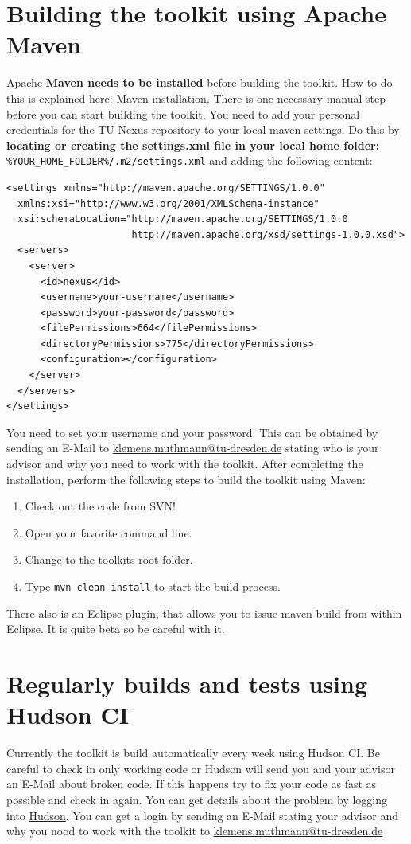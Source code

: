 \documentclass[a4paper,twoside]{book}      %
\begin{document}
\section{Building the toolkit using Apache Maven}
\label{sec:buildingthetoolkitusingapachemaven}
Apache \textbf{Maven needs to be installed} before building the toolkit. How to do this is explained here: \href{http://maven.apache.org/download.html#Installation}{Maven installation}. There is one necessary manual step before you can start building the toolkit. You need to add your personal credentials for the TU Nexus repository to your local maven settings. Do this by \textbf{locating or creating the settings.xml file in your local home folder:} \texttt{\%YOUR\_HOME\_FOLDER\%/.m2/settings.xml} and adding the following content:
\begin{verbatim}
<settings xmlns="http://maven.apache.org/SETTINGS/1.0.0"
  xmlns:xsi="http://www.w3.org/2001/XMLSchema-instance"
  xsi:schemaLocation="http://maven.apache.org/SETTINGS/1.0.0
                      http://maven.apache.org/xsd/settings-1.0.0.xsd">
  <servers>
    <server>
      <id>nexus</id>
      <username>your-username</username>
      <password>your-password</password>
      <filePermissions>664</filePermissions>
      <directoryPermissions>775</directoryPermissions>
      <configuration></configuration>
    </server>
  </servers>
</settings>
\end{verbatim}
You need to set your username and your password. This can be obtained by sending an E-Mail to \href{mailto:klemens.muthmann@tu-dresden.de}{klemens.muthmann@tu-dresden.de} stating who is your advisor and why you need to work with the toolkit. After completing the installation, perform the following steps to build the toolkit using Maven:
\begin{enumerate}
\item Check out the code from SVN!
\item Open your favorite command line.
\item Change to the toolkits root folder.
\item Type \texttt{mvn clean install} to start the build process.
\end{enumerate}
There also is an \href{http://m2eclipse.sonatype.org/}{Eclipse plugin}, that allows you to issue maven build from within Eclipse. It is quite beta so be careful with it.
\section{Regularly builds and tests using Hudson CI}
Currently the toolkit is build automatically every week using Hudson CI. Be careful to check in only working code or Hudson will send you and your advisor an E-Mail about broken code. If this happens try to fix your code as fast as possible and check in again. You can get details about the problem by logging into \href{http://www.effingo.de/hudson}{Hudson}. You can get a login by sending an E-Mail stating your advisor and why you nood to work with the toolkit to \href{mailto:klemens.muthmann@tu-dresden.de}{klemens.muthmann@tu-dresden.de}
\end{document}
